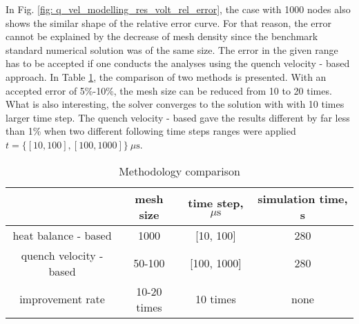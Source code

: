 In Fig. \ref{fig: q_vel_modelling_res_volt_rel_error}, the case with 1000 nodes also shows the similar shape of the relative error curve. For that reason, the error cannot be explained by the decrease of mesh density since the benchmark standard numerical solution was of the same size. The error in the given range has to be accepted if one conducts the analyses using the quench velocity - based approach. In Table \ref{table: 1d_qv_benchmarking_no_insulation_methods_comparison}, the comparison of two methods is presented. With an accepted error of 5\%-10\%, the mesh size can be reduced from 10 to 20 times. What is also interesting, the solver converges to the solution with with 10 times larger time step. The quench velocity - based gave the results different by far less than 1\% when two different following time steps ranges were applied $t=\{[10, 100], [100, 1000]\}~\mu \text{s}$.

\begin{table}[h!]
    \caption{Methodology comparison} 
    \vspace{-1.em} 
    \fontsize{10}{10}
    \selectfont 
    \renewcommand{\arraystretch}{1.5}
    \begin{center}
        \begin{tabular}{ cccc }  
        \hline
          & mesh size & time step, $\mu \text{s}$ & simulation time, s\\
        \hline
        heat balance - based & 1000 & [10, 100] & 280 \\
        quench velocity - based & 50-100 & [100, 1000] & 280 \\
        \hline 
        improvement rate & 10-20 times & 10 times & none\\
        \end{tabular}
    \end{center}  
     \label{table: 1d_qv_benchmarking_no_insulation_methods_comparison} 
 \end{table}